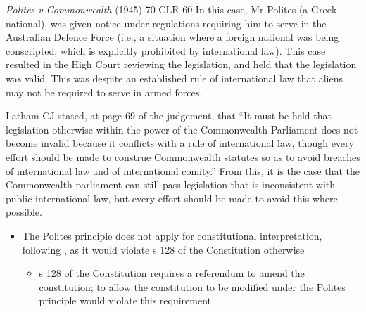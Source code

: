 \begin{casedetails}{\textit{Polites v Commonwealth} (1945) 70 CLR 60}\label{case:Polites v Commonwealth}
    \flushleft
    In this case, Mr Polites (a Greek national), was given notice under regulations requiring him to serve in the Australian Defence Force (i.e., a situation where a foreign national was being conscripted, which is explicitly prohibited by international law). This case resulted in the High Court reviewing the legislation, and held that the legislation was valid. This was despite an established rule of international law that aliens may not be required to serve in armed forces.

    \vspace{\baselineskip}

    Latham CJ stated, at page 69 of the judgement, that ``It must be held that legislation otherwise within the power of the Commonwealth Parliament does not become invalid because it conflicts with a rule of international law, though every effort should be made to construe Commonwealth statutes so as to avoid breaches of international law and of international comity.'' From this, it is the case that the Commonwealth parliament can still pass legislation that is inconsistent with public international law, but every effort should be made to avoid this where possible.
\end{casedetails}

\begin{itemize}
    \item The Polites principle does not apply for constitutional interpretation, following , as it would violate s 128 of the Constitution otherwise
    \begin{itemize}
        \item s 128 of the Constitution requires a referendum to amend the constitution; to allow the constitution to be modified under the Polites principle would violate this requirement
    \end{itemize}
\end{itemize}

